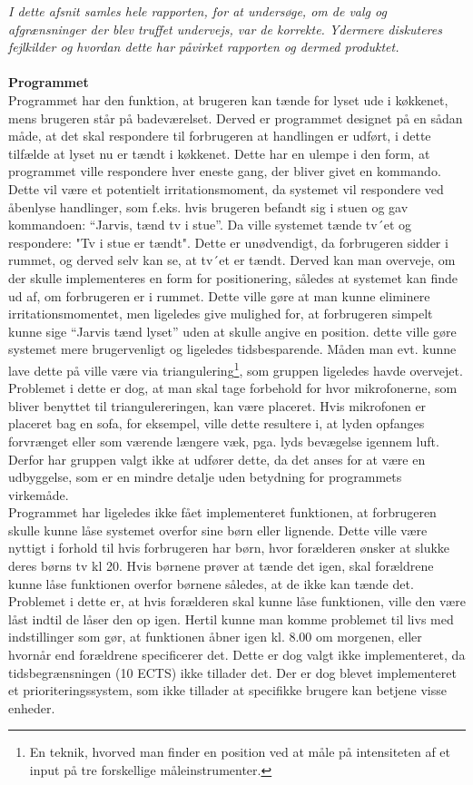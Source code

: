 \textit{I dette afsnit samles hele rapporten, for at undersøge, om de valg og afgrænsninger der blev truffet undervejs, var de korrekte. Ydermere diskuteres fejlkilder og hvordan dette har påvirket rapporten og dermed produktet.}
\\\\
{\bf Programmet}\\
Programmet har den funktion, at brugeren kan tænde for lyset ude i køkkenet, mens brugeren står på badeværelset. Derved er programmet designet på en sådan måde, at det skal respondere til forbrugeren at handlingen er udført, i dette tilfælde at lyset nu er tændt i køkkenet. Dette har en ulempe i den form, at programmet ville respondere hver eneste gang, der bliver givet en kommando. Dette vil være et potentielt irritationsmoment, da systemet vil respondere ved åbenlyse handlinger, som f.eks. hvis brugeren befandt sig i stuen og gav kommandoen: “Jarvis, tænd tv i stue”. Da ville systemet tænde tv´et og respondere: "Tv i stue er tændt". Dette er unødvendigt, da forbrugeren sidder i rummet, og derved selv kan se, at tv´et er tændt. Derved kan man overveje, om der skulle implementeres en form for positionering, således at systemet kan finde ud af, om forbrugeren er i rummet. Dette ville gøre at man kunne eliminere irritationsmomentet, men ligeledes give mulighed for, at forbrugeren simpelt kunne sige “Jarvis tænd lyset” uden at skulle angive en position. dette ville gøre systemet mere brugervenligt og ligeledes tidsbesparende. Måden man evt. kunne lave dette på ville være via triangulering\footnote{En teknik, hvorved man finder en position ved at måle på intensiteten af et input på tre forskellige måleinstrumenter.}, som gruppen ligeledes havde overvejet. Problemet i dette er dog, at man skal tage forbehold for hvor mikrofonerne, som bliver benyttet til triangulereringen, kan være placeret. Hvis mikrofonen er placeret bag en sofa, for eksempel, ville dette resultere i, at lyden opfanges forvrænget eller som værende længere væk, pga. lyds bevægelse igennem luft. Derfor har gruppen valgt ikke at udfører dette, da det anses for at være en udbyggelse, som er en mindre detalje uden betydning for programmets virkemåde.\\
Programmet har ligeledes ikke fået implementeret funktionen, at forbrugeren skulle kunne låse systemet overfor sine børn eller lignende. Dette ville være nyttigt i forhold til hvis forbrugeren har børn, hvor forælderen ønsker at slukke deres børns tv kl 20. Hvis børnene prøver at tænde det igen, skal forældrene kunne låse funktionen overfor børnene således, at de ikke kan tænde det. Problemet i dette er, at hvis forælderen skal kunne låse funktionen, ville den være låst indtil de låser den op igen. Hertil kunne man komme problemet til livs med indstillinger som gør, at funktionen åbner igen kl. 8.00 om morgenen, eller hvornår end forældrene specificerer det. Dette er dog valgt ikke implementeret, da tidsbegrænsningen (10 ECTS) ikke tillader det. Der er dog blevet implementeret et prioriteringssystem, som ikke tillader at specifikke brugere kan betjene visse enheder. \\

